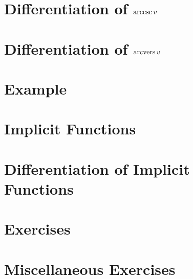 \section{Differentiation of $\operatorname{arccsc} v$}
\label{sec:05:31}

\section{Differentiation of $\operatorname{arcvers} v$}
\label{sec:05:32}

\section{Example}
\label{sec:05:33}

\section{Implicit Functions}
\label{sec:05:34}

\section{Differentiation of Implicit Functions}
\label{sec:05:35}

\section{Exercises}
\label{sec:05:36}

\section{Miscellaneous Exercises}
\label{sec:05:37}
